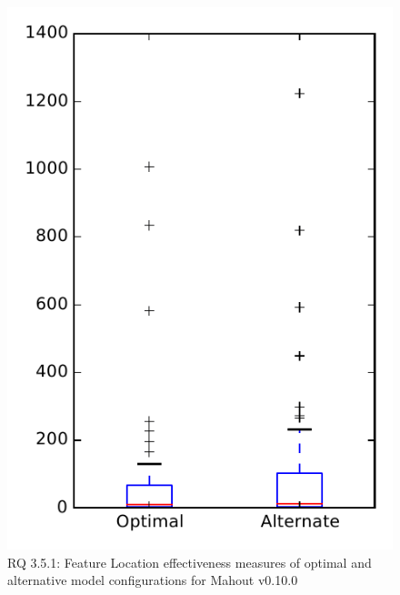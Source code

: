 
\begin{figure}
\centering
\includegraphics[height=0.4\textheight]{figures/combo/flt_rq1_mahout}
\caption{RQ 3.5.1: Feature Location effectiveness measures of optimal and alternative model configurations for Mahout v0.10.0}
\label{fig:combo:flt:rq1:mahout}
\end{figure}
